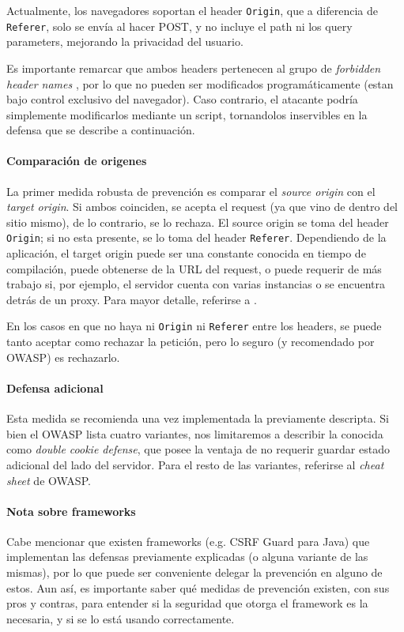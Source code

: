 \documentclass{article}
\theoremstyle{definition}
\begin{document}
Actualmente, los navegadores soportan el header \texttt{Origin}, que a
diferencia de \texttt{Referer}, solo se envía al hacer POST, y no incluye el
path ni los query parameters, mejorando la privacidad del usuario.

Es importante remarcar que ambos headers pertenecen al grupo de
\textit{forbidden header names} \cite{fetch}, por lo que no pueden ser modificados
programáticamente (estan bajo control exclusivo del navegador). Caso
contrario, el atacante podría simplemente modificarlos mediante un script,
tornandolos inservibles en la defensa que se describe a continuación.

\paragraph{Comparación de origenes} La primer medida robusta de
prevención es comparar el \textit{source origin} con el \textit{target origin}.
Si ambos coinciden, se acepta el request (ya que vino de dentro del
sitio mismo), de lo contrario, se lo rechaza.
El source origin se toma del header \verb+Origin+; si no esta presente, se lo
toma del header \verb+Referer+.
Dependiendo de la aplicación, el target origin puede ser una constante conocida
en tiempo de compilación, puede obtenerse de la URL del request, o puede
requerir de más trabajo si, por ejemplo, el servidor cuenta con varias
instancias o se encuentra detrás de un proxy. Para mayor detalle, referirse a
\cite{owasp}.

En los casos en que no haya ni \verb+Origin+ ni \verb+Referer+ entre los
headers, se puede tanto aceptar como rechazar la petición, pero lo seguro (y
recomendado por OWASP) es rechazarlo.

\paragraph{Defensa adicional} Esta medida se recomienda una vez implementada la
previamente descripta. Si bien el OWASP lista cuatro variantes, nos limitaremos
a describir la conocida como \textit{double cookie defense}, que posee la
ventaja de no requerir guardar estado adicional del lado del servidor. Para el
resto de las variantes, referirse al \textit{cheat sheet} de OWASP.

\paragraph{Nota sobre frameworks} Cabe mencionar que existen frameworks (e.g.
CSRF Guard para Java) que implementan las defensas previamente explicadas (o
alguna variante de las mismas), por lo que puede ser conveniente delegar la
prevención en alguno de estos. Aun así, es importante saber qué medidas de
prevención existen, con sus pros y contras, para entender si la seguridad que
otorga el framework es la necesaria, y si se lo está usando correctamente.
\end{document}
